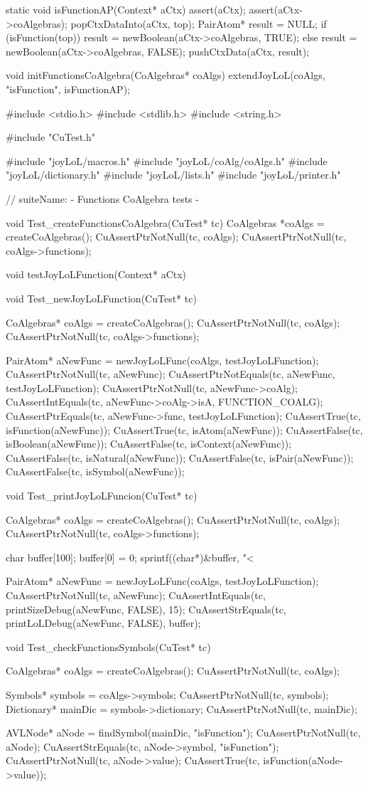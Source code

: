 static void isFunctionAP(Context* aCtx) {
  assert(aCtx);
  assert(aCtx->coAlgebras);
  popCtxDataInto(aCtx, top);
  PairAtom* result = NULL;
  if (isFunction(top)) result = newBoolean(aCtx->coAlgebras, TRUE);
  else                 result = newBoolean(aCtx->coAlgebras, FALSE);
  pushCtxData(aCtx, result);
}

void initFunctionsCoAlgebra(CoAlgebras* coAlgs) {
  extendJoyLoL(coAlgs, "isFunction", isFunctionAP);
}
\stoptyping

\starttyping
#include <stdio.h>
#include <stdlib.h>
#include <string.h>

#include "CuTest.h"

#include "joyLoL/macros.h"
#include "joyLoL/coAlg/coAlgs.h"
#include "joyLoL/dictionary.h"
#include "joyLoL/lists.h"
#include "joyLoL/printer.h"

// suiteName: - Functions CoAlgebra tests -

void Test_createFunctionsCoAlgebra(CuTest* tc) {
  CoAlgebras *coAlgs = createCoAlgebras();
  CuAssertPtrNotNull(tc, coAlgs);
  CuAssertPtrNotNull(tc, coAlgs->functions);
}

void testJoyLoLFunction(Context* aCtx) { }


void Test_newJoyLoLFunction(CuTest* tc) {
  CoAlgebras* coAlgs = createCoAlgebras();
  CuAssertPtrNotNull(tc, coAlgs);
  CuAssertPtrNotNull(tc, coAlgs->functions);

  PairAtom* aNewFunc = newJoyLoLFunc(coAlgs, testJoyLoLFunction);
  CuAssertPtrNotNull(tc, aNewFunc);
  CuAssertPtrNotEquals(tc, aNewFunc, testJoyLoLFunction);
  CuAssertPtrNotNull(tc, aNewFunc->coAlg);
  CuAssertIntEquals(tc, aNewFunc->coAlg->isA, FUNCTION_COALG);
  CuAssertPtrEquals(tc, aNewFunc->func, testJoyLoLFunction);
  CuAssertTrue(tc, isFunction(aNewFunc));
  CuAssertTrue(tc, isAtom(aNewFunc));
  CuAssertFalse(tc, isBoolean(aNewFunc));
  CuAssertFalse(tc, isContext(aNewFunc));
  CuAssertFalse(tc, isNatural(aNewFunc));
  CuAssertFalse(tc, isPair(aNewFunc));
  CuAssertFalse(tc, isSymbol(aNewFunc));
}

void Test_printJoyLoLFuncion(CuTest* tc) {
  CoAlgebras* coAlgs = createCoAlgebras();
  CuAssertPtrNotNull(tc, coAlgs);
  CuAssertPtrNotNull(tc, coAlgs->functions);

  char buffer[100];
  buffer[0] = 0;
  sprintf((char*)&buffer, "<%

  PairAtom* aNewFunc = newJoyLoLFunc(coAlgs, testJoyLoLFunction);
  CuAssertPtrNotNull(tc, aNewFunc);
  CuAssertIntEquals(tc, printSizeDebug(aNewFunc, FALSE), 15);
  CuAssertStrEquals(tc, printLoLDebug(aNewFunc, FALSE), buffer);
}

void Test_checkFunctionsSymbols(CuTest* tc) {
  CoAlgebras* coAlgs = createCoAlgebras();
  CuAssertPtrNotNull(tc, coAlgs);

  Symbols* symbols = coAlgs->symbols;
  CuAssertPtrNotNull(tc, symbols);
  Dictionary* mainDic = symbols->dictionary;
  CuAssertPtrNotNull(tc, mainDic);

  AVLNode* aNode = findSymbol(mainDic, "isFunction");
  CuAssertPtrNotNull(tc, aNode);
  CuAssertStrEquals(tc, aNode->symbol, "isFunction");
  CuAssertPtrNotNull(tc, aNode->value);
  CuAssertTrue(tc, isFunction(aNode->value));
}

\stoptyping